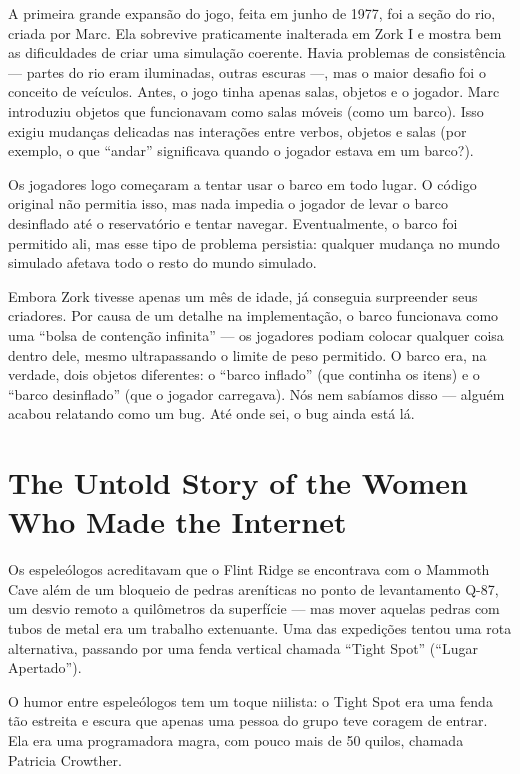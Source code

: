 \documentclass[12pt,a4paper]{article}
\begin{document}
A primeira grande expansão do jogo, feita em junho de 1977, foi a seção do rio, criada por Marc. Ela sobrevive praticamente inalterada em Zork I e mostra bem as dificuldades de criar uma simulação coerente.
Havia problemas de consistência — partes do rio eram iluminadas, outras escuras —, mas o maior desafio foi o conceito de veículos.
Antes, o jogo tinha apenas salas, objetos e o jogador. Marc introduziu objetos que funcionavam como salas móveis (como um barco). Isso exigiu mudanças delicadas nas interações entre verbos, objetos e salas (por exemplo, o que “andar” significava quando o jogador estava em um barco?).

Os jogadores logo começaram a tentar usar o barco em todo lugar. O código original não permitia isso, mas nada impedia o jogador de levar o barco desinflado até o reservatório e tentar navegar. Eventualmente, o barco foi permitido ali, mas esse tipo de problema persistia: qualquer mudança no mundo simulado afetava todo o resto do mundo simulado.

Embora Zork tivesse apenas um mês de idade, já conseguia surpreender seus criadores. Por causa de um detalhe na implementação, o barco funcionava como uma “bolsa de contenção infinita” — os jogadores podiam colocar qualquer coisa dentro dele, mesmo ultrapassando o limite de peso permitido. O barco era, na verdade, dois objetos diferentes: o “barco inflado” (que continha os itens) e o “barco desinflado” (que o jogador carregava).
Nós nem sabíamos disso — alguém acabou relatando como um bug. Até onde sei, o bug ainda está lá.

\section{The Untold Story of the Women Who Made the Internet}
\textcite{evans2018broadband}

Os espeleólogos acreditavam que o Flint Ridge se encontrava com o Mammoth Cave além de um bloqueio de pedras areníticas no ponto de levantamento Q-87, um desvio remoto a quilômetros da superfície — mas mover aquelas pedras com tubos de metal era um trabalho extenuante.
Uma das expedições tentou uma rota alternativa, passando por uma fenda vertical chamada “Tight Spot” (“Lugar Apertado”).

O humor entre espeleólogos tem um toque niilista: o Tight Spot era uma fenda tão estreita e escura que apenas uma pessoa do grupo teve coragem de entrar.
Ela era uma programadora magra, com pouco mais de 50 quilos, chamada Patricia Crowther.
\end{document}
